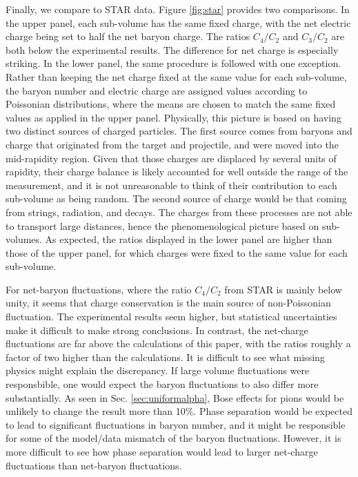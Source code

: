 Finally, we compare to STAR data. Figure \ref{fig:star} provides two comparisons. In the upper panel, each sub-volume has the same fixed charge, with the net electric charge being set to half the net baryon charge. The ratios $C_4/C_2$ and $C_3/C_2$ are both below the experimental results. The difference for net charge is especially striking. In the lower panel, the same procedure is followed with one exception. Rather than keeping the net charge fixed at the same value for each sub-volume, the baryon number and electric charge are assigned values according to Poissonian distributions, where the means are chosen to match the same fixed values as applied in the upper panel. Physically, this picture is based on having two distinct sources of charged particles. The first source comes from baryons and charge that originated from the target and projectile, and were moved into the mid-rapidity region. Given that those charges are displaced by several units of rapidity, their charge balance is likely accounted for well outside the range of the measurement, and it is not unreasonable to think of their contribution to each sub-volume as being random. The second source of charge would be that coming from strings, radiation, and decays. The charges from these processes are not able to transport large distances, hence the phenomenological picture based on sub-volumes. As expected, the ratios displayed in the lower panel are higher than those of the upper panel, for which charges were fixed to the same value for each sub-volume.

For net-baryon fluctuations, where the ratio $C_4/C_2$ from STAR is mainly below unity, it seems that charge conservation is the main source of non-Poissonian fluctuation. The experimental results seem higher, but statistical uncertainties make it difficult to make strong conclusions. In contrast, the net-charge fluctuations are far above the calculations of this paper, with the ratios roughly a factor of two higher than the calculations. It is difficult to see what missing physics might explain the discrepancy. If large volume fluctuations were responsbible, one would expect the baryon fluctuations to also differ more substantially. As seen in Sec. \ref{sec:uniformalpha}, Bose effects for pions would be unlikely to change the result more than 10\%. Phase separation would be expected to lead to significant fluctuations in baryon number, and it might be responsible for some of the model/data mismatch of the baryon fluctuations. However, it is more difficult to see how phase separation would lead to larger net-charge fluctuations than net-baryon fluctuations.

